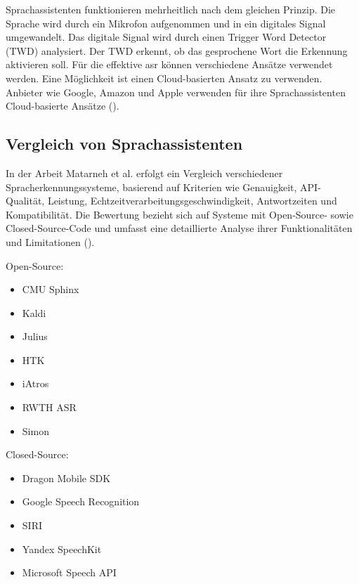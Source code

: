 \documentclass[11pt,a4paper]{article}
\begin{document}
\noindent \newline
Sprachassistenten funktionieren mehrheitlich nach dem gleichen Prinzip. Die Sprache wird
durch ein Mikrofon aufgenommen und in ein digitales Signal umgewandelt. Das digitale Signal wird
durch einen Trigger Word Detector (TWD) analysiert. Der TWD erkennt, ob das gesprochene Wort die 
Erkennung aktivieren soll. Für die effektive \gls{asr} können verschiedene Ansätze verwendet
werden. Eine Möglichkeit ist einen Cloud-basierten Ansatz zu verwenden. Anbieter wie Google,
Amazon und Apple verwenden für ihre Sprachassistenten Cloud-basierte Ansätze 
(\cite{matarneh2017speechrecognition}). 

\subsection{Vergleich von Sprachassistenten}\label{sec:vergleich_sprachassistenten}

In der Arbeit Matarneh et al. erfolgt ein Vergleich verschiedener Spracherkennungssysteme, basierend 
auf Kriterien wie Genauigkeit, API-Qualität, Leistung, Echtzeitverarbeitungsgeschwindigkeit, 
Antwortzeiten und Kompatibilität. Die Bewertung bezieht sich auf Systeme mit Open-Source- sowie 
Closed-Source-Code und umfasst eine detaillierte Analyse ihrer Funktionalitäten und Limitationen 
(\cite{matarneh2017speechrecognition}).

\raggedcolumns
\begin{multicols}{2}
	\small 
	\setlength\itemsep{0em} 

	\noindent Open-Source:
	\begin{itemize}[itemsep=0px, parsep=0px]
	\item CMU Sphinx
	\item Kaldi
	\item Julius
	\item HTK
	\item iAtros
	\item RWTH ASR
	\item Simon
	\end{itemize}
	
	\columnbreak
	
	\noindent Closed-Source:
	\begin{itemize}[itemsep=0px, parsep=0px]
	\item Dragon Mobile SDK
	\item Google Speech Recognition
	\item SIRI
	\item Yandex SpeechKit
	\item Microsoft Speech API
	\end{itemize}

\end{multicols}
	
\end{document}
